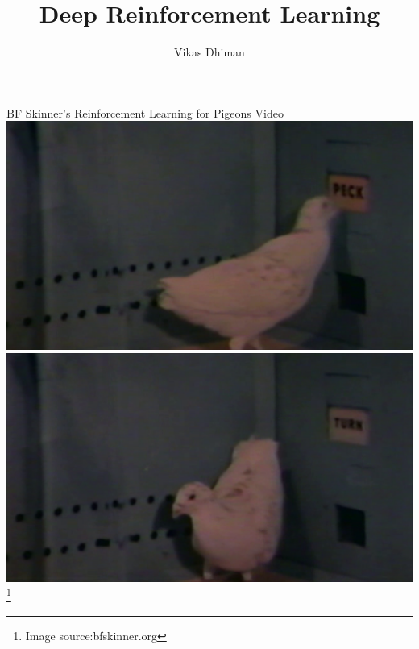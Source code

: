 \documentclass[notes]{beamer} %
\title[DRL for DL experts]{Deep Reinforcement Learning }
\author{Vikas Dhiman}
\begin{document}
\maketitle

%

\begin{frame}{BF Skinner's Reinforcement Learning for Pigeons}
  \centering
  \href{http://bfskinner.org/wp-content/uploads/2015/02/Operant_Conditioning.mp4}{Video}\\
  \includegraphics[width=0.45\linewidth]{media/pigeon-peck.png}%
  \includegraphics[width=0.45\linewidth]{media/pigeon-turn.png}
  \footnote{Image source:bfskinner.org}

\end{frame}

\end{document}
